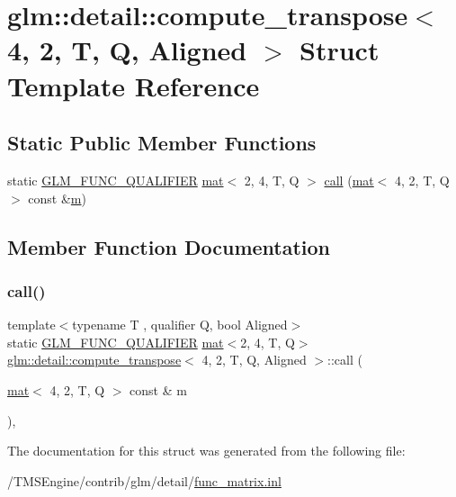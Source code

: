 \hypertarget{structglm_1_1detail_1_1compute__transpose_3_014_00_012_00_01_t_00_01_q_00_01_aligned_01_4}{}\section{glm\+:\+:detail\+:\+:compute\+\_\+transpose$<$ 4, 2, T, Q, Aligned $>$ Struct Template Reference}
\label{structglm_1_1detail_1_1compute__transpose_3_014_00_012_00_01_t_00_01_q_00_01_aligned_01_4}
\subsection*{Static Public Member Functions}
\begin{DoxyCompactItemize}
\item 
static \hyperlink{setup_8hpp_a33fdea6f91c5f834105f7415e2a64407}{G\+L\+M\+\_\+\+F\+U\+N\+C\+\_\+\+Q\+U\+A\+L\+I\+F\+I\+ER} \hyperlink{structglm_1_1mat}{mat}$<$ 2, 4, T, Q $>$ \hyperlink{structglm_1_1detail_1_1compute__transpose_3_014_00_012_00_01_t_00_01_q_00_01_aligned_01_4_a5e13270991a1ebde3bd571f789996db8}{call} (\hyperlink{structglm_1_1mat}{mat}$<$ 4, 2, T, Q $>$ const \&\hyperlink{_s_d_l__opengl__glext_8h_af593500c283bf1a787a6f947f503a5c2}{m})
\end{DoxyCompactItemize}


\subsection{Member Function Documentation}
\mbox{\label{structglm_1_1detail_1_1compute__transpose_3_014_00_012_00_01_t_00_01_q_00_01_aligned_01_4_a5e13270991a1ebde3bd571f789996db8}} 
\subsubsection{\texorpdfstring{call()}{call()}}
{\footnotesize\ttfamily template$<$typename T , qualifier Q, bool Aligned$>$ \\
static \hyperlink{setup_8hpp_a33fdea6f91c5f834105f7415e2a64407}{G\+L\+M\+\_\+\+F\+U\+N\+C\+\_\+\+Q\+U\+A\+L\+I\+F\+I\+ER} \hyperlink{structglm_1_1mat}{mat}$<$2, 4, T, Q$>$ \hyperlink{structglm_1_1detail_1_1compute__transpose}{glm\+::detail\+::compute\+\_\+transpose}$<$ 4, 2, T, Q, Aligned $>$\+::call (\begin{DoxyParamCaption}\item[{\hyperlink{structglm_1_1mat}{mat}$<$ 4, 2, T, Q $>$ const \&}]{m }\end{DoxyParamCaption})\hspace{0.3cm}{\ttfamily [inline]}, {\ttfamily [static]}}



The documentation for this struct was generated from the following file\+:\begin{DoxyCompactItemize}
\item 
/\+T\+M\+S\+Engine/contrib/glm/detail/\hyperlink{func__matrix_8inl}{func\+\_\+matrix.\+inl}\end{DoxyCompactItemize}
